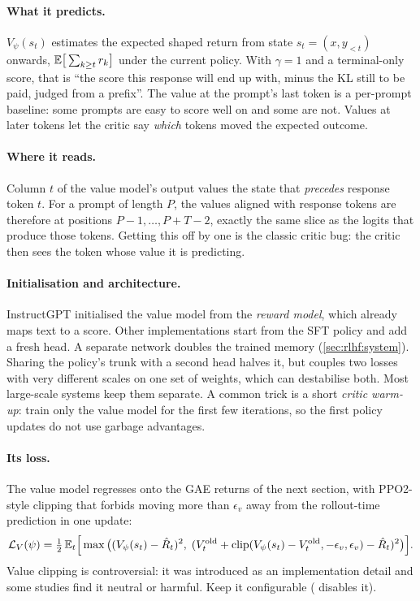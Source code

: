 \paragraph{What it predicts.} $V_\psi(s_t)$ estimates the expected shaped return from state
$s_t = (x, y_{<t})$ onwards, $\mathbb{E}\big[\sum_{k\ge t} r_k\big]$ under the current policy. With
$\gamma=1$ and a terminal-only score, that is ``the score this response will end up with,
minus the KL still to be paid, judged from a prefix''. The value at the prompt's last token is
a per-prompt baseline: some prompts are easy to score well on and some are not. Values at later
tokens let the critic say \emph{which} tokens moved the expected outcome.

\paragraph{Where it reads.} Column $t$ of the value model's output values the state that
\emph{precedes} response token $t$. For a prompt of length $P$, the values aligned with response
tokens are therefore at positions $P-1,\dots,P+T-2$, exactly the same slice as the logits that
produce those tokens. Getting this off by one is the classic critic bug: the critic then sees the
token whose value it is predicting.

\paragraph{Initialisation and architecture.} InstructGPT initialised the value model from the
\emph{reward model}, which already maps text to a score. Other implementations start from the
SFT policy and add a fresh head. A separate network doubles the trained memory
(\cref{sec:rlhf:system}). Sharing the policy's trunk with a second head halves it, but couples
two losses with very different scales on one set of weights, which can destabilise both. Most
large-scale systems keep them separate. A common trick is a short \emph{critic warm-up}: train
only the value model for the first few iterations, so the first policy updates do not use
garbage advantages.

\paragraph{Its loss.} The value model regresses onto the GAE returns of the next section, with
PPO2-style clipping that forbids moving more than $\epsilon_v$ away from the rollout-time
prediction in one update:
\begin{equation}
  \mathcal{L}_V(\psi) = \tfrac12\,\mathbb{E}_t\Big[\max\big((V_\psi(s_t)-\hat R_t)^2,\;
   (V^{\text{old}}_t + \operatorname{clip}(V_\psi(s_t)-V^{\text{old}}_t,-\epsilon_v,\epsilon_v)-\hat R_t)^2\big)\Big].
  \label{eq:rlhf:vloss}
\end{equation}
Value clipping is controversial: it was introduced as an implementation detail and some studies
find it neutral or harmful. Keep it configurable ( disables it).


